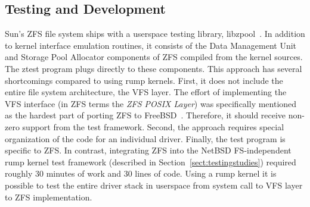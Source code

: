 \subsection{Testing and Development}

Sun's ZFS file system ships with a userspace testing library,
libzpool~\cite{zfs_source_tour}.  In addition to kernel interface
emulation routines, it consists of the Data Management Unit and
Storage Pool Allocator components of ZFS compiled from the kernel
sources.  The ztest program plugs directly to these components.
This approach has several shortcomings compared to using rump
kernels.  First, it does not include the entire file system
architecture, \eg the VFS layer.  The effort of implementing the
VFS interface (in ZFS terms the \textit{ZFS POSIX Layer}) was
specifically mentioned as the hardest part of porting ZFS to
FreeBSD~\cite{pjd:zfs}.  Therefore, it should receive non-zero
support from the test framework.  Second, the approach requires special organization
of the code for an individual driver.  Finally, the
test program is specific to ZFS.  In contrast, integrating ZFS into
the NetBSD FS-independent rump kernel test framework (described in
Section~\ref{sect:testingstudies}) required roughly 30 minutes of
work and 30 lines of code.
Using a rump kernel it is possible to test the entire driver
stack in userspace from system call to VFS layer to ZFS implementation.
